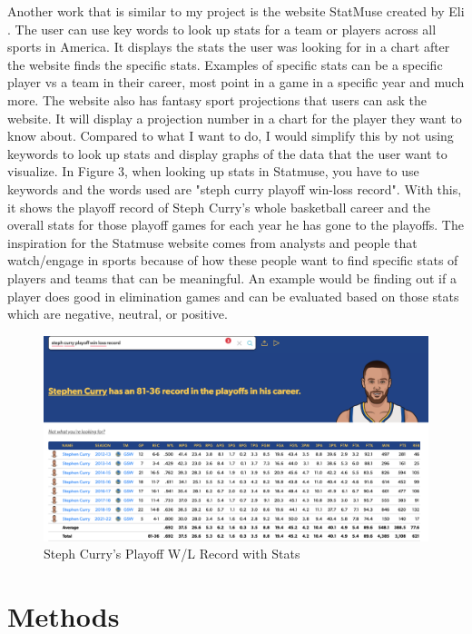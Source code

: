 \documentclass[10pt,twocolumn]{article}
\begin{document}
Another work that is similar to my project is the website StatMuse created by Eli 
\textcite{statmuse}.
The user can use key words to look up stats for a team or players across all sports in America. It displays the stats the user was looking for in a chart after the website finds the specific stats. Examples of specific stats can be a specific player vs a team in their career, most point in a game in a specific year and much more. The website also has fantasy sport projections that users can ask the website. It will display a projection number in a chart for the player they want to know about. Compared to what I want to do, I would simplify this by not using keywords to look up stats and display graphs of the data that the user want to visualize. In Figure 3, when looking up stats in Statmuse, you have to use keywords and the words used are "steph curry playoff win-loss record". With this, it shows the playoff record of Steph Curry's whole basketball career and the overall stats for those playoff games for each year he has gone to the playoffs. The inspiration for the Statmuse website comes from analysts and people that watch/engage in sports because of how these people want to find specific stats of players and teams that can be meaningful. An example would be finding out if a player does good in elimination games and can be evaluated based on those stats which are negative, neutral, or positive. 

\begin{figure}
    \centering
    \includegraphics[width=.98\linewidth]{StatsMuse_Curry.png}
    \caption{
        Steph Curry's Playoff W/L Record with Stats
    }
    \label{fig:second-page-2}
\end{figure}

\section{Methods}
\end{document}
